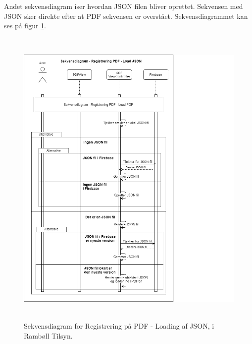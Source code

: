 Andet sekvensdiagram iser hvordan JSON filen bliver oprettet. Sekvensen med JSON sker direkte efter at PDF sekvensen er overstået. Sekvensdiagrammet kan ses på figur \ref{fig:LoadJSONSekvensDiagram}.
\begin{figure}[H] %
	\centering
	\includegraphics[height=15cm, width=15cm]{Design/Applikation/RegistrePDF/LoadJSONSekvensDiagram}
	\caption{Sekvensdiagram for Registrering på PDF - Loading af JSON, i Rambøll Tilsyn.}
	\label{fig:LoadJSONSekvensDiagram}
\end{figure}

\clearpage

